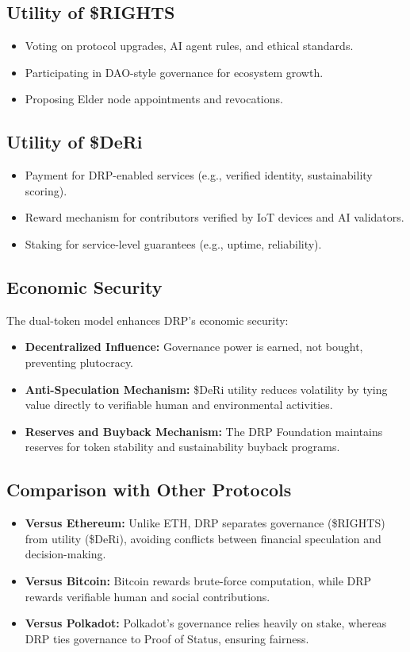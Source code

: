 \documentclass[11pt,a4paper]{article}
\begin{document}
\subsection{Utility of \$RIGHTS}
\begin{itemize}
    \item Voting on protocol upgrades, AI agent rules, and ethical standards.
    \item Participating in DAO-style governance for ecosystem growth.
    \item Proposing Elder node appointments and revocations.
\end{itemize}

\subsection{Utility of \$DeRi}
\begin{itemize}
    \item Payment for DRP-enabled services (e.g., verified identity, sustainability scoring).
    \item Reward mechanism for contributors verified by IoT devices and AI validators.
    \item Staking for service-level guarantees (e.g., uptime, reliability).
\end{itemize}

\subsection{Economic Security}
The dual-token model enhances DRP’s economic security:
\begin{itemize}
    \item \textbf{Decentralized Influence:} Governance power is earned, not bought, preventing plutocracy.
    \item \textbf{Anti-Speculation Mechanism:} \$DeRi utility reduces volatility by tying value directly to verifiable human and environmental activities.
    \item \textbf{Reserves and Buyback Mechanism:} The DRP Foundation maintains reserves for token stability and sustainability buyback programs.
\end{itemize}

\subsection{Comparison with Other Protocols}
\begin{itemize}
    \item \textbf{Versus Ethereum:} Unlike ETH, DRP separates governance (\$RIGHTS) from utility (\$DeRi), avoiding conflicts between financial speculation and decision-making.
    \item \textbf{Versus Bitcoin:} Bitcoin rewards brute-force computation, while DRP rewards verifiable human and social contributions.
    \item \textbf{Versus Polkadot:} Polkadot’s governance relies heavily on stake, whereas DRP ties governance to Proof of Status, ensuring fairness.
\end{itemize}
\end{document}
